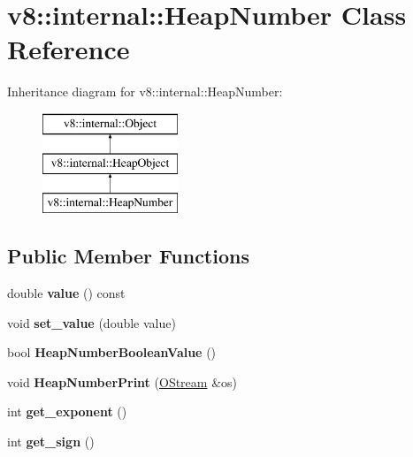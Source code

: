 \hypertarget{classv8_1_1internal_1_1_heap_number}{}\section{v8\+:\+:internal\+:\+:Heap\+Number Class Reference}
\label{classv8_1_1internal_1_1_heap_number}
Inheritance diagram for v8\+:\+:internal\+:\+:Heap\+Number\+:\begin{figure}[H]
\begin{center}
\leavevmode
\includegraphics[height=3.000000cm]{classv8_1_1internal_1_1_heap_number}
\end{center}
\end{figure}
\subsection*{Public Member Functions}
\begin{DoxyCompactItemize}
\item 
\hypertarget{classv8_1_1internal_1_1_heap_number_a9d64b2e3b1c243fad7d9217ec63e4f6e}{}double {\bfseries value} () const \label{classv8_1_1internal_1_1_heap_number_a9d64b2e3b1c243fad7d9217ec63e4f6e}

\item 
\hypertarget{classv8_1_1internal_1_1_heap_number_ac6726d8db750c4b11885a6b6e724f640}{}void {\bfseries set\+\_\+value} (double value)\label{classv8_1_1internal_1_1_heap_number_ac6726d8db750c4b11885a6b6e724f640}

\item 
\hypertarget{classv8_1_1internal_1_1_heap_number_a2d2c0f1c6b28629c46aea753d3bb0bb6}{}bool {\bfseries Heap\+Number\+Boolean\+Value} ()\label{classv8_1_1internal_1_1_heap_number_a2d2c0f1c6b28629c46aea753d3bb0bb6}

\item 
\hypertarget{classv8_1_1internal_1_1_heap_number_aa86a13a217f97f05056950473043b9fb}{}void {\bfseries Heap\+Number\+Print} (\hyperlink{classv8_1_1internal_1_1_o_stream}{O\+Stream} \&os)\label{classv8_1_1internal_1_1_heap_number_aa86a13a217f97f05056950473043b9fb}

\item 
\hypertarget{classv8_1_1internal_1_1_heap_number_a90729bf6ec40a432cace27186f005584}{}int {\bfseries get\+\_\+exponent} ()\label{classv8_1_1internal_1_1_heap_number_a90729bf6ec40a432cace27186f005584}

\item 
\hypertarget{classv8_1_1internal_1_1_heap_number_abef98f476e59d21c329250c98330d986}{}int {\bfseries get\+\_\+sign} ()\label{classv8_1_1internal_1_1_heap_number_abef98f476e59d21c329250c98330d986}

\end{DoxyCompactItemize}
